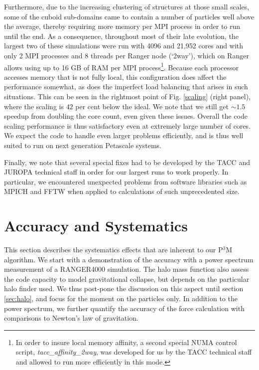 \documentclass[useAMS,usenatbib]{mn2e}
\begin{document}
Furthermore, due to the increasing clustering of structures at those small 
scales, some of the cuboid sub-domains came to contain a number of particles
well above the 
average, thereby requiring more memory per {\small MPI} process
in order to run until the end. 
As a consequence,  throughout most of their late evolution, the 
largest two of these simulations were run with 4096 and 21,952 cores and 
with only 2 {\small MPI} processes and 8 threads per Ranger node (`2way'), which on 
Ranger allows using up to 16 GB of RAM per {\small MPI} process\footnote{In order to insure 
local memory affinity,  a second special NUMA control script, {\it tacc\_affinity\_2way}, 
was developed for us by the TACC technical staff and allowed to run more efficiently 
in this mode.}. Because each processor accesses memory that is not fully local, this configuration does affect the 
performance somewhat, as does the imperfect load balancing that arises in such situations.
This can be seen in the rightmost point of Fig. \ref{scaling} (right panel), where the scaling is $42$ per cent below the ideal.
We note that we still get $\sim1.5$ speedup
from doubling the core count, even given these issues. Overall the
code scaling performance is thus satisfactory even at extremely large number of cores.
 We expect the code to handle even larger problems efficiently, and is thus well suited to run on
  next generation Petascale systems. 

Finally, we note that several special fixes had to be developed by  the TACC 
and JUROPA technical staff in order for our largest runs to work properly.
In particular, we encountered unexpected problems from software libraries such as 
{\small MPICH} and {\small FFTW} when applied to calculations of such 
unprecedented size. 

%

\section{Accuracy and Systematics}
\label{sec:accuracy}
 
 This section describes the systematics effects that are inherent to our P$^{3}$M algorithm.
 We start with a demonstration of the accuracy with a power spectrum measurement of a RANGER4000 simulation. 
 The halo mass function also assess the code capacity to model gravitational collapse, 
 but depends on the particular halo finder used.
 We thus post-pone the discussion on this aspect until section \ref{sec:halo},
and focus for the moment on the particles only. In addition to the power spectrum, we further quantify the accuracy of the force calculation
 with comparisons to Newton's law of gravitation.
 
\end{document}
